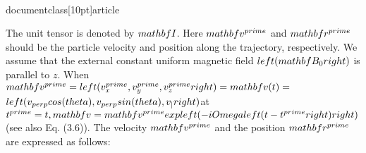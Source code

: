 \\documentclass[10pt]{article}
\begin{document}
{{{{The unit tensor is denoted by $\\mathbf{I}$. Here $\\mathbf{v}^{\\prime}$ and $\\mathbf{r}^{\\prime}$ should be the particle velocity and position along the trajectory, respectively. We assume that the external constant uniform magnetic field $\\left(\\mathbf{B}_{0}\\right)$ is parallel to $z$. When $\\mathbf{v}^{\\prime}=\\left(v_{x}^{\\prime}, v_{y}^{\\prime}, v_{z}^{\\prime}\\right)=\\mathbf{v}(t)=$ $\\left(v_{\\perp} \\cos (\\theta), v_{\\perp} \\sin (\\theta), v_{\\|}\\right)$at $t^{\\prime}=t, \\mathbf{v}=\\mathbf{v}^{\\prime} \\exp \\left(-i \\Omega\\left(t-t^{\\prime}\\right)\\right)$ (see also Eq. (3.6)). The velocity $\\mathbf{v}^{\\prime}$ and the position $\\mathbf{r}^{\\prime}$ are expressed as follows:


}}}}
\end{document}
